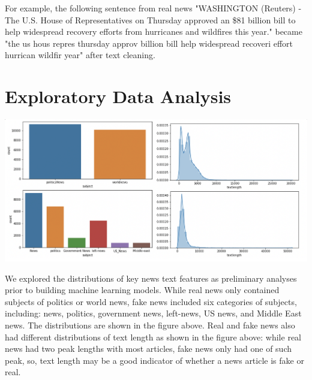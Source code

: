 \documentclass{article}
\begin{document}
\begin{multicols}{2}
For example, the following sentence from real news "WASHINGTON (Reuters) - The U.S. House of Representatives on Thursday approved an \$81 billion bill to help widespread recovery efforts from hurricanes and wildfires this year." became "the us hous repres thursday approv billion bill help widespread recoveri effort hurrican wildfir year" after text cleaning.

\section{Exploratory Data Analysis}


\begin{center}
\includegraphics[scale=0.25]{images/img4.png}
\end{center}

We explored the distributions of key news text features as preliminary analyses prior to building machine learning models. While real news only contained subjects of politics or world news, fake news included six categories of subjects, including: news, politics, government news, left-news, US news, and Middle East news. The distributions are shown in the figure above. Real and fake news also had different distributions of text length as shown in the figure above: while real news had two peak lengths with most articles, fake news only had one of such peak, so, text length may be a good indicator of whether a news article is fake or real.  



\end{multicols}
\end{document}
